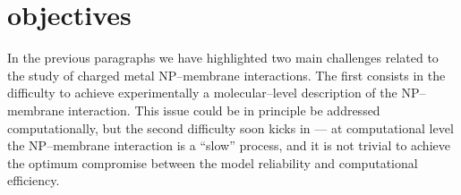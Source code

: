 

\section{objectives}
In the previous paragraphs we have highlighted two main challenges related to the study of charged metal \ac{NP}--membrane interactions. The first consists in the difficulty to achieve experimentally a molecular--level description of the \ac{NP}--membrane interaction. This issue could be in principle be addressed computationally, but the second difficulty soon kicks in --- at computational level the \ac{NP}--membrane interaction is a ``slow'' process, and it is not trivial to achieve the optimum compromise between the model reliability and computational efficiency.

